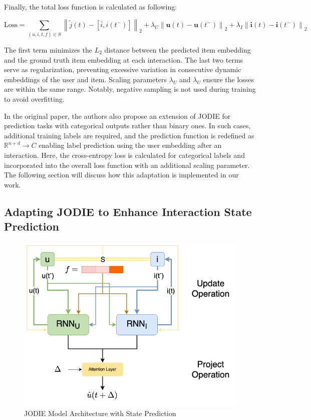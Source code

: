 Finally, the total loss function is calculated as following:

\begin{equation}
    \text{Loss} = \sum_{(u, i, t, f) \in S} \left\| \tilde{j}(t) - \left[ \bar{i}, i(t^-) \right] \right\|_2 
    + \lambda_U \left\| \mathbf{u}(t) - \mathbf{u}(t^-) \right\|_2 
    + \lambda_I \left\| \mathbf{i}(t) - \mathbf{i}(t^-) \right\|_2
    \end{equation}


The first term minimizes the  $L_2$ distance between the predicted item embedding and the ground truth item embedding at each interaction. The last two terms serve as regularization, preventing excessive variation in consecutive dynamic embeddings of the user and item. Scaling parameters  $\lambda_U$ and $\lambda_U$ ensure the losses are within the same range. Notably, negative sampling is not used during training to avoid overfitting.


In the original paper, the authors also propose an extension of JODIE for prediction tasks with categorical outputs rather than binary ones. In such cases, additional training labels are required, and the prediction function is redefined as $\mathbb{R} ^{n+d}\rightarrow C$ enabling label prediction using the user embedding after an interaction. Here, the cross-entropy loss is calculated for categorical labels and incorporated into the overall loss function with an additional scaling parameter. The following section will discuss how this adaptation is implemented in our work.




\subsection{Adapting JODIE to Enhance Interaction State Prediction}
\begin{figure}[h]
    \centering
    \includegraphics[width=0.8\linewidth]{figures/04_JODIE_with_state.png}
    \caption{JODIE Model Architecture with State Prediction}
    \label{fig:JODIE_with_state}
\end{figure}


